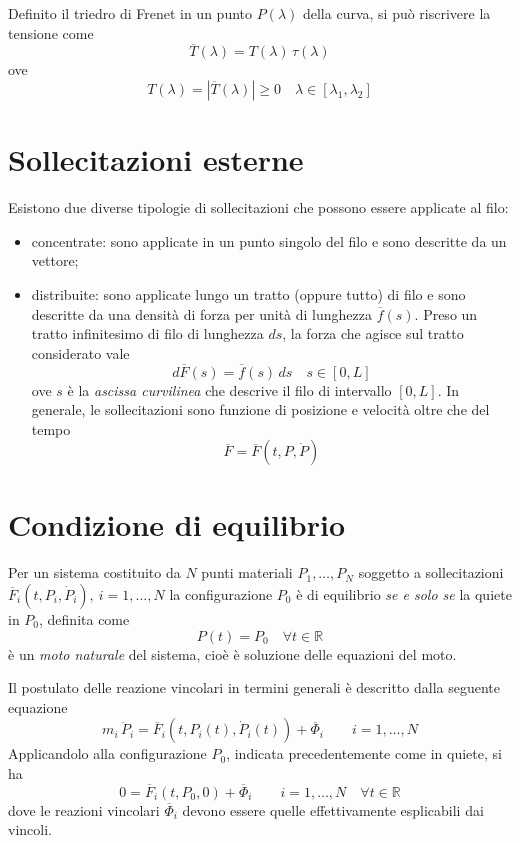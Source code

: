 Definito il triedro di Frenet in un punto $P(\lambda)$ della curva, si può riscrivere la tensione come
\[
	\overline{T}(\lambda) = T(\lambda)\,\hat{\tau}(\lambda)
\]
ove
\[
T(\lambda) = \left|\overline{T}(\lambda)\right|\geq 0 \quad \lambda\in[\lambda_1, \lambda_2]
\]

\section{Sollecitazioni esterne}
Esistono due diverse tipologie di sollecitazioni che possono essere applicate al filo:
\begin{itemize}
	\item concentrate: sono applicate in un punto singolo del filo e sono descritte da un vettore;
	\item distribuite: sono applicate lungo un tratto (oppure tutto) di filo e sono descritte da una densità di forza per unità di lunghezza $\overline{f}(s)$. Preso un tratto infinitesimo di filo di lunghezza $ds$, la forza che agisce sul tratto considerato vale
	\[
		d\overline{F}(s) = \overline{f}(s)\,ds \quad s\in[0,L]
	\]
	ove $s$ è la \emph{ascissa curvilinea} che descrive il filo di intervallo $[0,L]$.
	In generale, le sollecitazioni sono funzione di posizione e velocità oltre che del tempo
	\[
	\overline{F} = \overline{F}(t, P, \dot{P})
	\]
\end{itemize}

\section{Condizione di equilibrio}
Per un sistema costituito da $N$ punti materiali ${P_1, \dots, P_N}$ soggetto a sollecitazioni $\overline{F}_i (t, P_i, \dot{P}_i),~ i=1,\dots,N$ la configurazione $P_0$ è di equilibrio \emph{se e solo se} la quiete in $P_0$, definita come
\[
P(t) = P_0\quad \forall t\in\mathbb{R}
\]
è un \emph{moto naturale} del sistema, cioè è soluzione delle equazioni del moto.

Il postulato delle reazione vincolari in termini generali è descritto dalla seguente equazione
\[
m_i\,\ddot{P}_i = \overline{F}_i(t,P_i(t), \dot{P}_i(t)) + \overline{\Phi}_i\qquad i=1,\dots,N
\]
Applicandolo alla configurazione $P_0$, indicata precedentemente come in quiete, si ha
\begin{equation}
	\label{eq:equilibrio_p0}
	0 = \overline{F}_i (t, P_0, 0) + \overline{\Phi}_i\qquad i = 1,\dots, N\quad\forall t\in\mathbb{R}
\end{equation}
dove le reazioni vincolari $\overline{\Phi}_i$ devono essere quelle effettivamente esplicabili dai vincoli.

